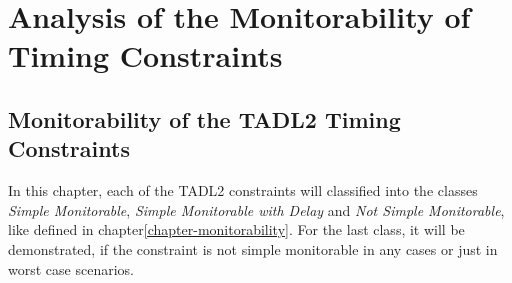 \chapter{Analysis of the Monitorability of Timing Constraints}

\section{Monitorability of the TADL2 Timing Constraints}
	In this chapter, each of the TADL2 constraints will classified into the classes \emph{Simple Monitorable}, \emph{Simple Monitorable with Delay} and \emph{Not Simple Monitorable}, like defined in chapter\ref{chapter-monitorability}. For the last class, it will be demonstrated, if the constraint is not simple monitorable in any cases or just in worst case scenarios.

